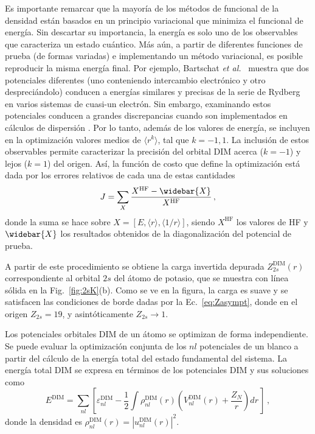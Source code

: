 Es importante remarcar que la mayoría de los métodos de funcional de la 
densidad están basados en un principio variacional que minimiza el 
funcional de energía. Sin descartar su importancia, la energía es solo
uno de los observables que caracteriza un estado cuántico. Más aún, a 
partir de diferentes funciones de prueba (de formas variadas) e 
implementando un método variacional, es posible reproducir la misma 
energía final. Por ejemplo, Bartschat \textit{et al.}~\cite{Albright:93,
Bartschat:96} muestra que dos potenciales diferentes (uno conteniendo 
intercambio electrónico y otro despreciándolo) conducen a energías 
similares y precisas de la serie de Rydberg en varios sistemas de 
cuasi-un electrón. Sin embargo, examinando estos potenciales conducen a 
grandes discrepancias cuando son implementados en cálculos de dispersión 
\cite{BartschatBray:96}. Por lo tanto, además de los valores de energía, 
se incluyen en la optimización valores medios de $\langle r^k \rangle$, 
tal que $k=-1,1$. La inclusión de estos observables permite caracterizar 
la precisión del orbital DIM acerca ($k=-1$) y lejos ($k=1$) del origen. 
Así, la función de costo que define la optimización está dada por los 
errores relativos de cada una de estas cantidades
\begin{equation}
J=\sum_X \frac{X^{\mathrm{HF}}-\widebar{X}}{X^{\mathrm{HF}}}\,,
\label{eq:fncosto-dim}
\end{equation}
donde la suma se hace sobre 
$X=\left[E,\langle r \rangle,\langle 1/r \rangle\right]$, siendo 
$X^{\mathrm{HF}}$ los valores de HF y $\widebar{X}$ los resultados 
obtenidos de la diagonalización del potencial de prueba. 

A partir de este procedimiento se obtiene la carga invertida depurada 
$Z_{2s}^{\mathrm{DIM}}(r)$ correspondiente al orbital $2s$ del átomo 
de potasio, que se muestra con línea sólida en la Fig.~\ref{fig:2sK}(b).
Como se ve en la figura, la carga es suave y se satisfacen las 
condiciones de borde dadas por la Ec.~\ref{eq:Zasympt}, donde en el 
origen $Z_{2s} = 19$, y asintóticamente $Z_{2s} \rightarrow 1$.

Los potenciales orbitales DIM de un átomo se optimizan de forma 
independiente. Se puede evaluar la optimización conjunta de los $nl$ 
potenciales de un blanco a partir del cálculo de la energía total del 
estado fundamental del sistema. La energía total DIM se expresa en 
términos de los potenciales DIM y sus soluciones como
\begin{equation}
E^{\mathrm{DIM}} = \sum\limits_{nl} 
\left[ 
\varepsilon_{nl}^{\mathrm{DIM}} - 
\frac{1}{2}\int  \rho_{nl}^{\mathrm{DIM}}(r)
\left( V_{nl}^{\mathrm{DIM}}(r) + \frac{Z_{N}}{r}\right) dr \,
\right] \, ,
\label{eq:Etotal}
\end{equation}
donde la densidad es 
$\rho_{nl}^{\mathrm{DIM}}(r)=|u_{nl}^{\mathrm{DIM}}(r)|^2$. 

